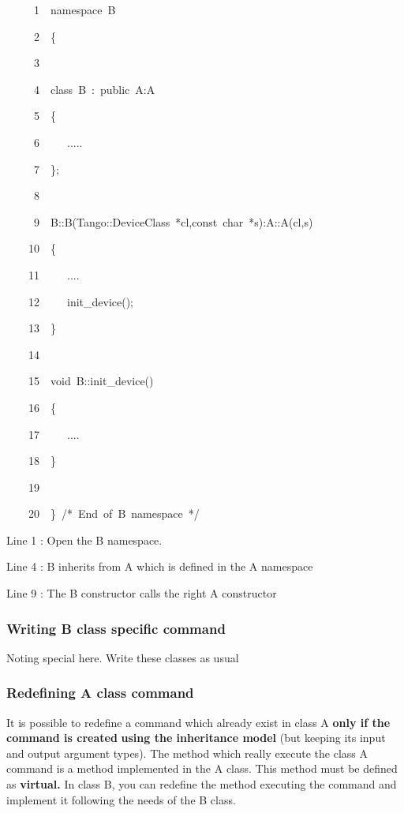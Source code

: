 
\begin{lyxcode}
~~~~~1~~namespace~B

~~~~~2~~\{

~~~~~3~~

~~~~~4~~class~B~:~public~A:A

~~~~~5~~\{

~~~~~6~~~~~.....

~~~~~7~~\};

~~~~~8~~

~~~~~9~~B::B(Tango::DeviceClass~{*}cl,const~char~{*}s):A::A(cl,s)

~~~~10~~\{

~~~~11~~~~~....

~~~~12~~~~~init\_device();

~~~~13~~\}

~~~~14~~

~~~~15~~void~B::init\_device()

~~~~16~~\{

~~~~17~~~~~....

~~~~18~~\}

~~~~19~~

~~~~20~~\}~/{*}~End~of~B~namespace~{*}/
\end{lyxcode}


Line 1 : Open the B namespace.

Line 4 : B inherits from A which is defined in the A namespace

Line 9 : The B constructor calls the right A constructor

\subsubsection{Writing B class specific command}

Noting special here. Write these classes as usual

\subsubsection{Redefining A class command}

It is possible to redefine a command which already exist in class
A \textbf{only if the command is created} \textbf{using the inheritance
model} (but keeping its input and output argument types). The method
which really execute the class A command is a method implemented in
the A class. This method must be defined as \textbf{virtual.} In class
B, you can redefine the method executing the command and implement
it following the needs of the B class.


